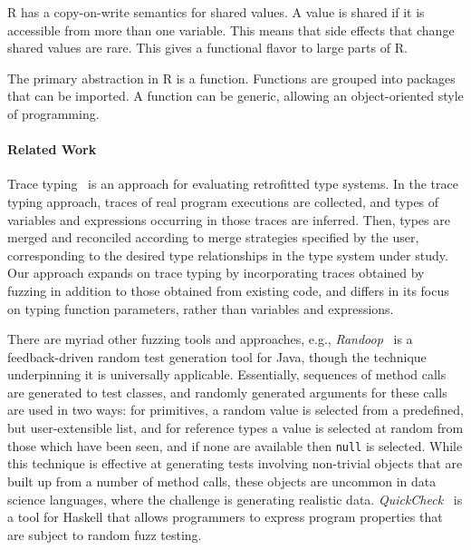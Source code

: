 \documentclass[sigplan,anonymous,review]{acmart}
\begin{document}
\begin{compactitem}[$-$]
\item R has a copy-on-write semantics for shared values. A value is shared if
    it is accessible from more than one variable. This means that side effects
    that change shared values are rare. This gives a functional flavor to large
    parts of R.

\item The primary abstraction in R is a function. Functions are grouped into
    packages that can be imported. A function can be generic, allowing an
    object-oriented style of programming.  

\end{compactitem}


\paragraph{Related Work}
Trace typing~\cite{andreasen2016trace} is an approach for evaluating retrofitted type systems.
In the trace typing approach, traces of real program executions are collected, and types of variables and expressions occurring in those traces are inferred.
Then, types are merged and reconciled according to merge strategies specified by the user, corresponding to the desired type relationships in the type system under study.
Our approach expands on trace typing by incorporating traces obtained by fuzzing in addition to those obtained from existing code, and differs in its focus on typing function parameters, rather than variables and expressions.

There are myriad other fuzzing tools and approaches, e.g., \emph{Randoop}~\cite{pacheco2007randoop} is a feedback-driven random test generation tool for Java, though the technique underpinning it is universally applicable.
Essentially, sequences of method calls are generated to test classes, and randomly generated arguments for these calls are used in two ways: for primitives, a random value is selected from a predefined, but user-extensible list, and for reference types a value is selected at random from those which have been seen, and if none are available then {\tt null} is selected.
While this technique is effective at generating tests involving non-trivial objects that are built up from a number of method calls, these objects are uncommon in data science languages, where the challenge is generating realistic data.
\emph{QuickCheck}~\cite{quickcheck} is a tool for Haskell that allows programmers to express program properties that are subject to random fuzz testing.
\end{document}
